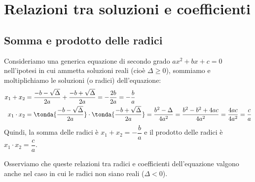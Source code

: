 
\section{Relazioni tra soluzioni e coefficienti}
\label{sec:eq2gr_coefficienti}

\subsection{Somma e prodotto delle radici}
Consideriamo una generica equazione di secondo grado 
\(a x^2 +bx +c = 0\) 
nell'ipotesi in cui ammetta soluzioni reali (cioè \(\Delta \geq 0\)), 
sommiamo e moltiplichiamo le soluzioni (o radici) dell'equazione:
\begin{align*}
x_1 +x_2 &= \dfrac{-b -\sqrt{\Delta}}{2a} +\dfrac{-b +\sqrt{\Delta}}{2a} = 
-\dfrac{2b}{2a} = -\dfrac{b}{a}\\
x_1 \cdot x_2 &=
\tonda{\dfrac{-b -\sqrt{\Delta}}{2a}} \cdot 
\tonda{\dfrac{-b +\sqrt{\Delta}}{2a}} = 
\dfrac{b^{2} -\Delta}{4a^2} = \dfrac{b^2 -b^2 +4ac}{4a^2} = 
\dfrac{4ac}{4a^2}=\dfrac{c}{a}
\end{align*}
Quindi, la somma delle radici è \(x_1 +x_2 = -\dfrac{b}{a}\) e il 
prodotto delle radici è \(x_1 \cdot x_2 = \dfrac{c}{a}\).

Osserviamo che queste relazioni tra radici e coefficienti dell'equazione 
valgono anche nel caso in cui le radici non siano reali (\(\Delta<0\)).

